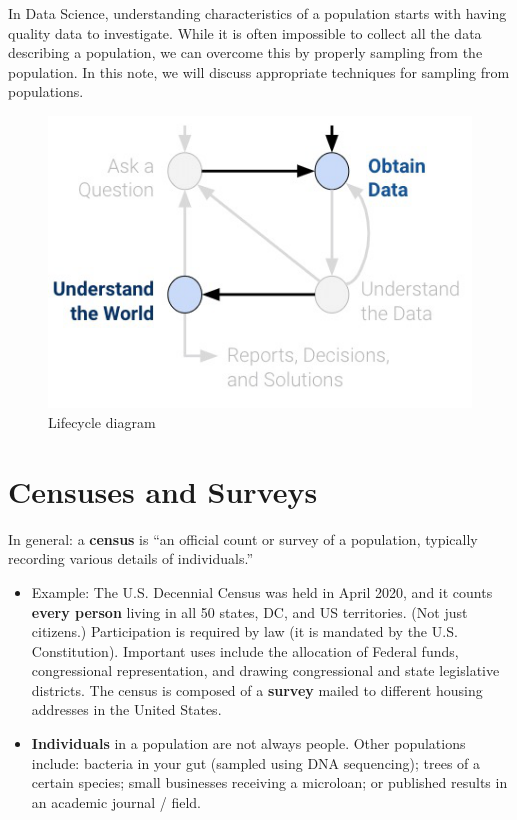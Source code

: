 \documentclass[
  letterpaper,
  DIV=11,
  numbers=noendperiod]{scrreprt}
\providecommand{\tightlist}{%
  \setlength{\itemsep}{0pt}\setlength{\parskip}{0pt}}\usepackage{longtable,booktabs,array}
\begin{document}
In Data Science, understanding characteristics of a population starts
with having quality data to investigate. While it is often impossible to
collect all the data describing a population, we can overcome this by
properly sampling from the population. In this note, we will discuss
appropriate techniques for sampling from populations.

\begin{figure}

{\centering \includegraphics{sampling/images/data_life_cycle_sampling.PNG}

}

\caption{Lifecycle diagram}

\end{figure}

\hypertarget{censuses-and-surveys}{%
\section{Censuses and Surveys}\label{censuses-and-surveys}}

In general: a \textbf{census} is ``an official count or survey of a
population, typically recording various details of individuals.''

\begin{itemize}
\tightlist
\item
  Example: The U.S. Decennial Census was held in April 2020, and it
  counts \textbf{every person} living in all 50 states, DC, and US
  territories. (Not just citizens.) Participation is required by law (it
  is mandated by the U.S. Constitution). Important uses include the
  allocation of Federal funds, congressional representation, and drawing
  congressional and state legislative districts. The census is composed
  of a \textbf{survey} mailed to different housing addresses in the
  United States.
\item
  \textbf{Individuals} in a population are not always people. Other
  populations include: bacteria in your gut (sampled using DNA
  sequencing); trees of a certain species; small businesses receiving a
  microloan; or published results in an academic journal / field.
\end{itemize}
\end{document}
